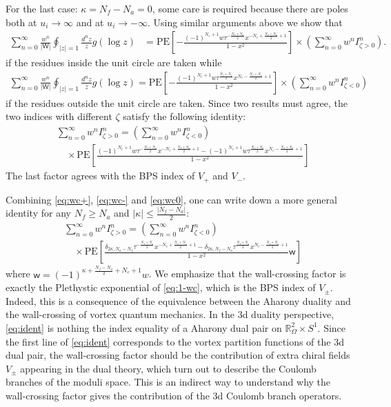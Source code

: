 \documentclass[a4paper,11pt]{article}
\begin{document}
For the last case: $\kappa = N_f-N_a = 0$, some care is required because there are poles both at $u_i \rightarrow \infty$ and at $u_i \rightarrow -\infty$. Using similar arguments above we show that
\begin{align}
\sum_{n = 0}^\infty \frac{w^n}{|\mathsf W|} \oint_{|z| = 1} \frac{d^n z}{z} g(\log z) &= \mathrm{PE}\left[-\frac{(-1)^{N_c+1} w \tau^{-\frac{N_f+N_a}{2}} x^{-N_c+\frac{N_f+N_a}{2}+1}}{1-x^2}\right] \times \left(\sum_{n = 0}^\infty w^n I^n_{\zeta > 0}\right).
\end{align}
if the residues inside the unit circle are taken while
\begin{align}
\sum_{n = 0}^\infty \frac{w^n}{|\mathsf W|} \oint_{|z| = 1} \frac{d^n z}{z} g(\log z) = \mathrm{PE}\left[-\frac{(-1)^{N_c+1} w \tau^{\frac{N_f+N_a}{2}} x^{N_c-\frac{N_f+N_a}{2}+1}}{1-x^2}\right] \times \left(\sum_{n = 0}^\infty w^n I^n_{\zeta < 0}\right)
\end{align}
if the residues outside the unit circle are taken. Since two results must agree, the two indices with different $\zeta$ satisfy the following identity:
\begin{align}
\label{eq:wc0}
& \sum_{n = 0}^\infty w^n I^n_{\zeta > 0} = \left(\sum_{n = 0}^\infty w^n I^n_{\zeta < 0}\right) \nonumber \\
&\quad \times \mathrm{PE}\left[\frac{(-1)^{N_c+1} w \tau^{-\frac{N_f+N_a}{2}} x^{-N_c+\frac{N_f+N_a}{2}+1}-(-1)^{N_c+1} w \tau^{\frac{N_f+N_a}{2}} x^{N_c-\frac{N_f+N_a}{2}+1}}{1-x^2}\right]
\end{align}
The last factor agrees with the BPS index of $V_+$ and $V_-$.

Combining \eqref{eq:wc+}, \eqref{eq:wc-} and \eqref{eq:wc0}, one can write down a more general identity for any $N_f \geq N_a$ and $|\kappa| \leq \frac{|N_f-N_a|}{2}$:
\begin{align}
\label{eq:ident}
& \sum_{n = 0}^\infty w^n I^n_{\zeta > 0} = \left(\sum_{n = 0}^\infty w^n I^n_{\zeta < 0}\right) \nonumber \\
&\quad \times \mathrm{PE}\left[\frac{\delta_{2 \kappa,N_a-N_f} \tau^{-\frac{N_f+N_a}{2}} x^{-N_c+\frac{N_f+N_a}{2}+1}-\delta_{2 \kappa,N_f-N_a} \tau^{\frac{N_f+N_a}{2}} x^{N_c-\frac{N_f+N_a}{2}+1}}{1-x^2} \mathsf w \right]
\end{align}
where $\mathsf w = (-1)^{\kappa+\frac{N_f-N_a}{2}+N_c+1} w$. We emphasize that the wall-crossing factor is exactly the Plethystic exponential of \eqref{eq:1-wc}, which is the BPS index of $V_\pm$. Indeed, this is a consequence of the equivalence between the Aharony duality and the wall-crossing of vortex quantum mechanics. In the 3d duality perspective, \eqref{eq:ident} is nothing the index equality of a Aharony dual pair on $\mathbb R_\Omega^2 \times S^1$. Since the first line of \eqref{eq:ident} corresponds to the vortex partition functions of the 3d dual pair, the wall-crossing factor should be the contribution of extra chiral fields $V_\pm$ appearing in the dual theory, which turn out to describe the Coulomb branches of the moduli space. This is an indirect way to understand why the wall-crossing factor gives the contribution of the 3d Coulomb branch operators.
\\
\end{document}

